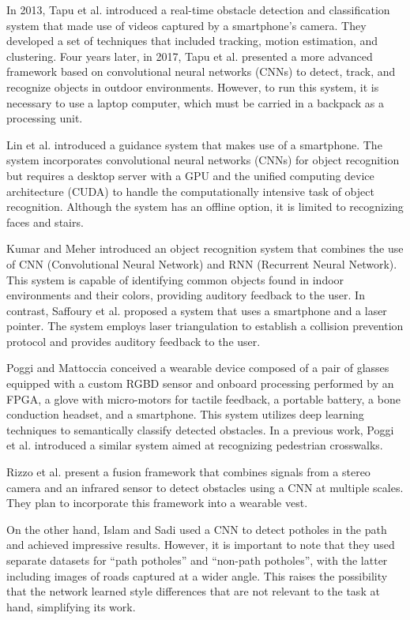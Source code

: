 \documentclass[preprint,12pt,authoryear]{elsarticle}
\begin{document}
In 2013, Tapu et al. \cite{tapu2013} introduced a real-time obstacle detection and classification system that made use of videos captured by a smartphone's camera. They developed a set of techniques that included tracking, motion estimation, and clustering. Four years later, in 2017, Tapu et al. \cite{tapu2017} presented a more advanced framework based on convolutional neural networks (CNNs) to detect, track, and recognize objects in outdoor environments. However, to run this system, it is necessary to use a laptop computer, which must be carried in a backpack as a processing unit.

Lin et al. \cite{lin2017} introduced a guidance system that makes use of a smartphone. The system incorporates convolutional neural networks (CNNs) for object recognition but requires a desktop server with a GPU and the unified computing device architecture (CUDA) to handle the computationally intensive task of object recognition. Although the system has an offline option, it is limited to recognizing faces and stairs.

Kumar and Meher \cite{kumar2015} introduced an object recognition system that combines the use of CNN (Convolutional Neural Network) and RNN (Recurrent Neural Network). This system is capable of identifying common objects found in indoor environments and their colors, providing auditory feedback to the user. In contrast, Saffoury et al. \cite{saffoury2016} proposed a system that uses a smartphone and a laser pointer. The system employs laser triangulation to establish a collision prevention protocol and provides auditory feedback to the user.

Poggi and Mattoccia \cite{poggi2016} conceived a wearable device composed of a pair of glasses equipped with a custom RGBD sensor and onboard processing performed by an FPGA, a glove with micro-motors for tactile feedback, a portable battery, a bone conduction headset, and a smartphone. This system utilizes deep learning techniques to semantically classify detected obstacles. In a previous work, Poggi et al. \cite{poggi2015} introduced a similar system aimed at recognizing pedestrian crosswalks.

Rizzo et al. \cite{rizzo2017} present a fusion framework that combines signals from a stereo camera and an infrared sensor to detect obstacles using a CNN at multiple scales. They plan to incorporate this framework into a wearable vest.

On the other hand, Islam and Sadi \cite{islam2018} used a CNN to detect potholes in the path and achieved impressive results. However, it is important to note that they used separate datasets for ``path potholes'' and ``non-path potholes'', with the latter including images of roads captured at a wider angle. This raises the possibility that the network learned style differences that are not relevant to the task at hand, simplifying its work.
\end{document}
